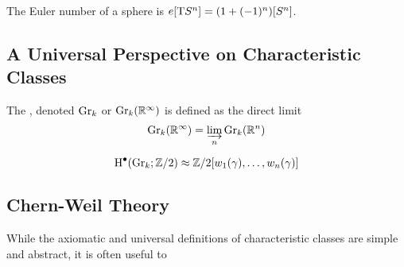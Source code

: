 \begin{corollary}
	The Euler number of a sphere is $e[\mathrm{T} S^n] = (1+(-1)^n)[S^n]$.
\end{corollary}

\subsection{A Universal Perspective on Characteristic Classes}\label{sec:universal-characteristic-classes}

\begin{definition}
	The , denoted $\mathrm{Gr}_k$ or $\mathrm{Gr}_k(\mathbb{R}^\infty)$ is defined as the direct limit
	\[
		\mathrm{Gr}_k(\mathbb{R}^\infty) = \varinjlim_n \mathrm{Gr}_k(\mathbb{R}^n)
	\]
\end{definition}

\begin{theorem}
	\[
		\operatorname{H}^\bullet(\mathrm{Gr}_k; \mathbb{Z}/2) \approx \mathbb{Z}/2[w_1(\gamma), \ldots, w_n(\gamma)]
	\]
\end{theorem}

\subsection{Chern-Weil Theory}\label{sec:chern-weil-theory}

While the axiomatic and universal definitions of characteristic classes are simple and abstract, it is often useful to
